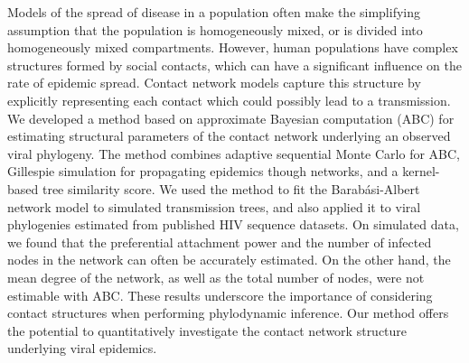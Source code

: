 Models of the spread of disease in a population often make the simplifying
assumption that the population is homogeneously mixed, or is divided into
homogeneously mixed compartments. However, human populations have complex
structures formed by social contacts, which can have a significant influence on
the rate of epidemic spread. Contact network models capture this structure by
explicitly representing each contact which could possibly lead to a
transmission. We developed a method based on approximate Bayesian
computation (ABC) for estimating structural parameters of the contact network
underlying an observed viral phylogeny. The method combines adaptive sequential
Monte Carlo for ABC, Gillespie simulation for propagating epidemics though
networks, and a kernel-based tree similarity score. We used the method to fit
the Barab\'{a}si-Albert network model to simulated transmission trees, and also
applied it to viral phylogenies estimated from  published
HIV sequence datasets. On simulated data, we found that the preferential
attachment power and the number of infected nodes in the network can often be
accurately estimated. On the other hand, the mean degree of the network, as
well as the total number of nodes, were not estimable with ABC.  
These results underscore the importance of considering contact structures when
performing phylodynamic inference. Our method offers the potential to
quantitatively investigate the contact network structure underlying viral
epidemics.
